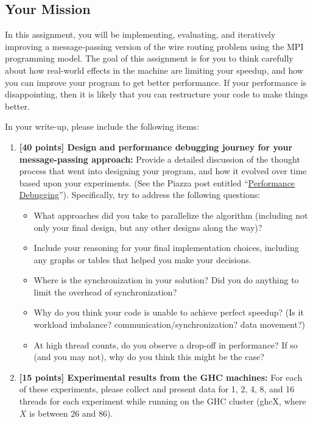 \documentclass[11pt]{article}
\begin{document}
\subsection*{Your Mission}

In this assignment, you will be implementing, evaluating, and iteratively improving a message-passing version of the wire routing problem using the MPI programming model. The goal of this assignment is for you to think carefully about how real-world effects in the machine are limiting your speedup, and how you can improve your program to get better performance. If your performance is disappointing, then it is likely that you can restructure your code to make things better.

In your write-up, please include the following items:

\begin{enumerate}
\item \textbf{[40 points] Design and performance debugging journey for your message-passing approach:} Provide a detailed discussion of the thought process that went into designing your program, and how it evolved over time based upon your experiments. (See the Piazza post entitled ``\href{https://piazza.com/class/memydqtylpq4sl/post/144}{Performance Debugging}''). Specifically, try to address the following questions:

\begin{itemize}
\item What approaches did you take to parallelize the algorithm (including not only your final design, but any other designs along the way)?
\item Include your reasoning for your final implementation choices, including any graphs or tables that helped you make your decisions.
\item Where is the synchronization in your solution? Did you do anything to limit the overhead of synchronization?
\item Why do you think your code is unable to achieve perfect speedup? (Is it workload imbalance? communication/synchronization? data movement?)
\item At high thread counts, do you observe a drop-off in performance? If so (and you may not), why do you think this might be the case?
\end{itemize}

\item \textbf{[15 points] Experimental results from the GHC machines:} For each of these experiments, please collect and present data for 1, 2, 4, 8, and 16 threads for each experiment while running on the GHC cluster (ghcX, where $X$ is between 26 and 86).


\end{enumerate}
\end{document}
